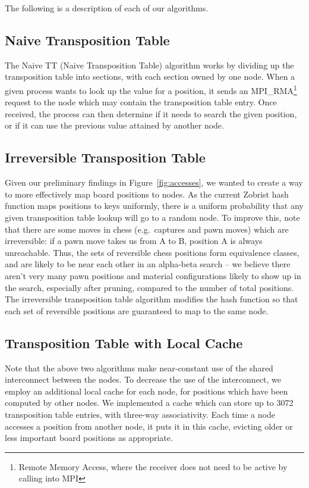 \documentclass{article}
\begin{document}
The following is a description of each of our algorithms.

\subsection{Naive Transposition Table}
The Naive TT (Naive Transposition Table) algorithm works by dividing up the
transposition table into sections, with each section owned by one node. When a
given process wants to look up the value for a position, it sends an
{MPI\_RMA}\footnote{Remote Memory Access, where the receiver does not need to be active by calling into MPI}
request to the node which may contain the transposition table entry. Once
received, the process can then determine if it needs to search the given
position, or if it can use the previous value attained by another node.

\subsection{Irreversible Transposition Table}
Given our preliminary findings in Figure~\ref{fig:accesses}, we wanted to
create a way to more effectively map board positions to nodes. As the current
Zobrist hash function maps positions to keys uniformly, there is a uniform
probability that any given transposition table lookup will go to a random node.
To improve this, note that there are some moves in chess (e.g.\ captures and pawn
moves) which are irreversible: if a pawn move takes us from A to B, position A
is always unreachable. Thus, the sets of reversible chess positions form
equivalence classes, and are likely to be near each other in an alpha-beta
search -- we believe there aren't very many pawn positions and material
configurations likely to show up in the search, especially after pruning,
compared to the number of total positions. The irreversible transposition table
algorithm modifies the hash
function so that each set of reversible positions are guaranteed to map to the
same node.

\subsection{Transposition Table with Local Cache}
Note that the above two algorithms make near-constant use of the shared
interconnect between the nodes. To decrease the use of the interconnect, we
employ an additional local cache for each node, for positions which have been
computed by other nodes. We implemented a cache which can store up to 3072
transposition table entries, with three-way associativity. Each time a node
accesses a position from another node, it puts it in this cache, evicting older
or less important board positions as appropriate.
\end{document}
